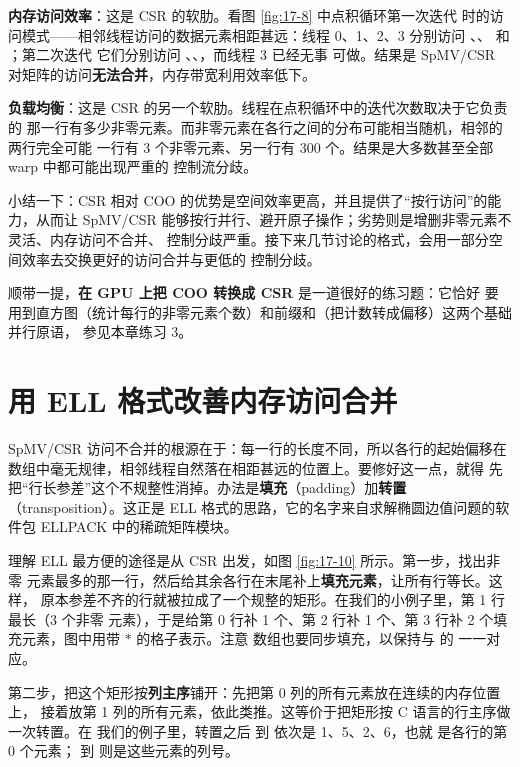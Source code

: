 \textbf{内存访问效率}：这是 CSR 的软肋。看图 \ref{fig:17-8} 中点积循环第一次迭代
时的访问模式——相邻线程访问的数据元素相距甚远：线程 0、1、2、3 分别访问
、、 和 ；第二次迭代
它们分别访问 、、，而线程 3 已经无事
可做。结果是 SpMV/CSR 对矩阵的访问\textbf{无法合并}，内存带宽利用效率低下。

\textbf{负载均衡}：这是 CSR 的另一个软肋。线程在点积循环中的迭代次数取决于它负责的
那一行有多少非零元素。而非零元素在各行之间的分布可能相当随机，相邻的两行完全可能
一行有 3 个非零元素、另一行有 300 个。结果是大多数甚至全部 warp 中都可能出现严重的
控制流分歧。

小结一下：CSR 相对 COO 的优势是空间效率更高，并且提供了“按行访问”的能力，从而让
SpMV/CSR 能够按行并行、避开原子操作；劣势则是增删非零元素不灵活、内存访问不合并、
控制分歧严重。接下来几节讨论的格式，会用一部分空间效率去交换更好的访问合并与更低的
控制分歧。

\noindent 顺带一提，\textbf{在 GPU 上把 COO 转换成 CSR} 是一道很好的练习题：它恰好
要用到直方图（统计每行的非零元素个数）和前缀和（把计数转成偏移）这两个基础并行原语，
参见本章练习 3。

\section{用 ELL 格式改善内存访问合并}
\label{sec:spmv-ell}

SpMV/CSR 访问不合并的根源在于：每一行的长度不同，所以各行的起始偏移在
 数组中毫无规律，相邻线程自然落在相距甚远的位置上。要修好这一点，就得
先把“行长参差”这个不规整性消掉。办法是\textbf{填充}（padding）加\textbf{转置}
（transposition）。这正是 ELL 格式的思路，它的名字来自求解椭圆边值问题的软件包
ELLPACK 中的稀疏矩阵模块\cite{rice2012ellpack}。

理解 ELL 最方便的途径是从 CSR 出发，如图 \ref{fig:17-10} 所示。第一步，找出非零
元素最多的那一行，然后给其余各行在末尾补上\textbf{填充元素}，让所有行等长。这样，
原本参差不齐的行就被拉成了一个规整的矩形。在我们的小例子里，第 1 行最长（3 个非零
元素），于是给第 0 行补 1 个、第 2 行补 1 个、第 3 行补 2 个填充元素，图中用带
$*$ 的格子表示。注意  数组也要同步填充，以保持与  的
一一对应。

第二步，把这个矩形按\textbf{列主序}铺开：先把第 0 列的所有元素放在连续的内存位置上，
接着放第 1 列的所有元素，依此类推。这等价于把矩形按 C 语言的行主序做一次转置。在
我们的例子里，转置之后  到  依次是 1、5、2、6，也就
是各行的第 0 个元素； 到  则是这些元素的列号。

